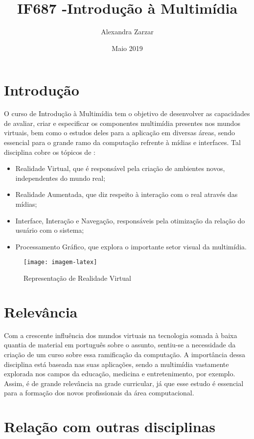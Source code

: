 \documentclass{article}
\title{IF687 -Introdução à Multimídia}
\author{Alexandra Zarzar}
\date{Maio 2019}
\begin{document}
\maketitle

\section{Introdução}
O curso de Introdução à Multimídia tem o objetivo de desenvolver as capacidades de avaliar, criar e especificar os componentes multimídia presentes nos mundos virtuais, bem como o estudos deles para a aplicação em diversas áreas, sendo essencial para o grande ramo da computação refrente à mídias e interfaces.  Tal disciplina cobre os tópicos de :
\begin{itemize}
    \item Realidade Virtual, que é responsável pela criação de ambientes novos, independentes do mundo real;
    \item Realidade Aumentada, que diz respeito à interação com o real através das mídias;
    \item Interface, Interação e Navegação, responsáveis pela otimização da relação do usuário com o sistema;
    \item Processamento Gráfico, que explora o importante setor visual da multimídia.
\end{itemize}

\begin{figure}[h!]
\centering
\texttt{[image: imagem-latex]}
\caption{Representação de Realidade Virtual}
\label{fig:Realidade Virtual}
\end{figure}

\section{Relevância}
Com a crescente influência dos mundos virtuais na tecnologia somada à baixa quantia de material em português sobre o assunto, sentiu-se a necessidade da criação de um curso sobre essa ramificação da computação. A importância dessa disciplina está baseada nas suas aplicações, sendo a multimídia vastamente explorada nos campos da educação, medicina e entretenimento, por exemplo. Assim, é de grande relevância na grade curricular, já que esse estudo é essencial para a formação dos novos profissionais da área computacional.

\section{Relação com outras disciplinas}
\end{document}
